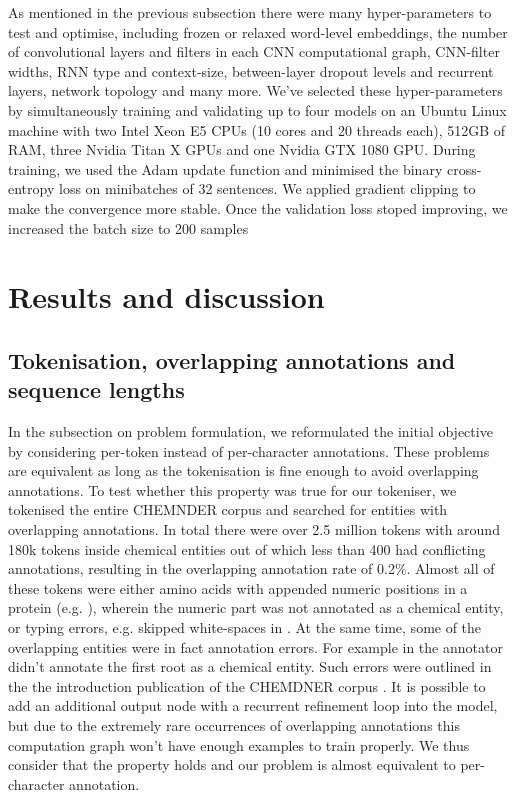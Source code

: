 \documentclass[twocolumn]{bmcart}%
\begin{document}
As mentioned in the previous subsection there were many hyper-parameters to test and optimise, including frozen or relaxed word-level embeddings, the number of convolutional layers and filters in each CNN computational graph, CNN-filter widths, RNN type and context-size, between-layer dropout levels and recurrent layers, network topology and many more.
We've selected these hyper-parameters by simultaneously training and validating up to four models on an Ubuntu Linux machine with two Intel Xeon E5 CPUs (10 cores and 20 threads each), 512GB of RAM, three Nvidia Titan X GPUs and one Nvidia GTX 1080 GPU.
During training, we used the Adam update function \cite{Kingma2014} and minimised the binary cross-entropy loss on minibatches of 32 sentences.
We applied gradient clipping to make the convergence more stable.
Once the validation loss stoped improving, we increased the batch size to 200 samples 

\section*{Results and discussion}

\subsection*{Tokenisation, overlapping annotations and sequence lengths}

In the subsection on problem formulation, we reformulated the initial objective by considering per-token instead of per-character annotations.
These problems are equivalent as long as the tokenisation is fine enough to avoid overlapping annotations.
To test whether this property was true for our tokeniser, we tokenised the entire CHEMNDER corpus and searched for entities with overlapping annotations.
In total there were over 2.5 million tokens with around 180k tokens inside chemical entities out of which less than 400 had conflicting annotations, resulting in the overlapping annotation rate of 0.2\%.
Almost all of these tokens were either amino acids with appended numeric positions in a protein (e.g. ), wherein the numeric part was not annotated as a chemical entity, or typing errors, e.g. skipped white-spaces in .
At the same time, some of the overlapping entities were in fact annotation errors.
For example in  the annotator didn't annotate the first root as a chemical entity.
Such errors were outlined in the the introduction publication of the CHEMDNER corpus \cite{Krallinger2015}.
It is possible to add an additional output node with a recurrent refinement loop into the model, but due to the extremely rare occurrences of overlapping annotations this computation graph won't have enough examples to train properly.
We thus consider that the property holds and our problem is almost equivalent to per-character annotation.
\end{document}
